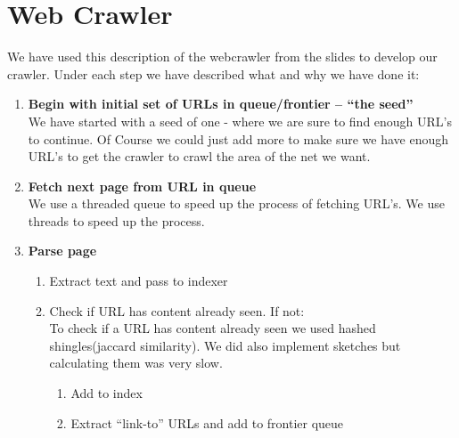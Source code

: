 \chapter{Web Crawler}
We have used this description of the webcrawler from the slides to develop our crawler. Under each step we have described what and why we have done it:

\begin{enumerate}[label=\textbf{\arabic*.}]
	\item \textbf{Begin with initial set of URLs in queue/frontier – “the seed”}\\
	We have started with a seed of one - where we are sure to find enough URL's to continue.
	Of Course we could just add more to make sure we have enough URL's to get the crawler to crawl the area of the net we want.
	
	\item \textbf{Fetch next page from URL in queue}\\
	We use a threaded queue to speed up the process of fetching URL's.
	We use threads to speed up the process.
	
	\item \textbf{Parse page}
	\begin{enumerate}
		\item Extract text and pass to indexer
		\item Check if URL has content already seen. If not:\\
		To check if a URL has content already seen we used hashed shingles(jaccard similarity).
		We did also implement sketches but calculating them was very slow.
		
		\begin{enumerate}
			\item Add to index
			\item Extract “link-to” URLs and add to frontier queue
		\end{enumerate}
	\end{enumerate}
\end{enumerate}